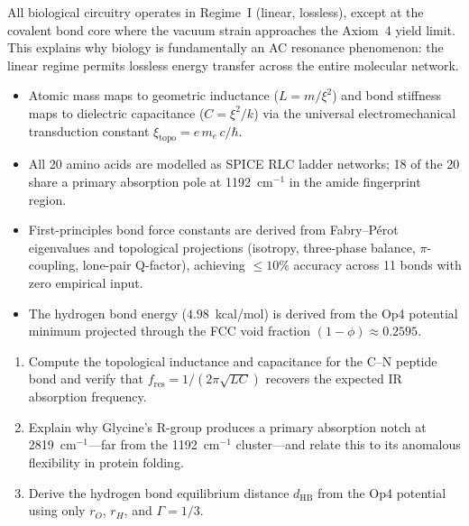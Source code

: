 \noindent All biological circuitry operates in Regime~I (linear, lossless), except at the covalent bond core where the vacuum strain approaches the Axiom~4 yield limit. This explains why biology is fundamentally an AC resonance phenomenon: the linear regime permits lossless energy transfer across the entire molecular network.

\begin{summarybox}
\begin{itemize}
    \item Atomic mass maps to geometric inductance ($L = m/\xi^2$) and bond stiffness maps to dielectric capacitance ($C = \xi^2/k$) via the universal electromechanical transduction constant $\xi_{\text{topo}} = e\,m_e\,c/\hbar$.
    \item All 20 amino acids are modelled as SPICE RLC ladder networks; 18 of the 20 share a primary absorption pole at 1192~cm$^{-1}$ in the amide fingerprint region.
    \item First-principles bond force constants are derived from Fabry--P\'{e}rot eigenvalues and topological projections (isotropy, three-phase balance, $\pi$-coupling, lone-pair Q-factor), achieving $\leq 10\%$ accuracy across 11 bonds with zero empirical input.
    \item The hydrogen bond energy ($4.98$~kcal/mol) is derived from the Op4 potential minimum projected through the FCC void fraction $(1-\phi) \approx 0.2595$.
\end{itemize}
\end{summarybox}

\begin{exercisebox}
\begin{enumerate}
    \item Compute the topological inductance and capacitance for the C--N peptide bond and verify that $f_{\text{res}} = 1/(2\pi\sqrt{LC})$ recovers the expected IR absorption frequency.
    \item Explain why Glycine's R-group produces a primary absorption notch at 2819~cm$^{-1}$---far from the 1192~cm$^{-1}$ cluster---and relate this to its anomalous flexibility in protein folding.
    \item Derive the hydrogen bond equilibrium distance $d_{\text{HB}}$ from the Op4 potential using only $r_O$, $r_H$, and $\Gamma = 1/3$.
\end{enumerate}
\end{exercisebox}

